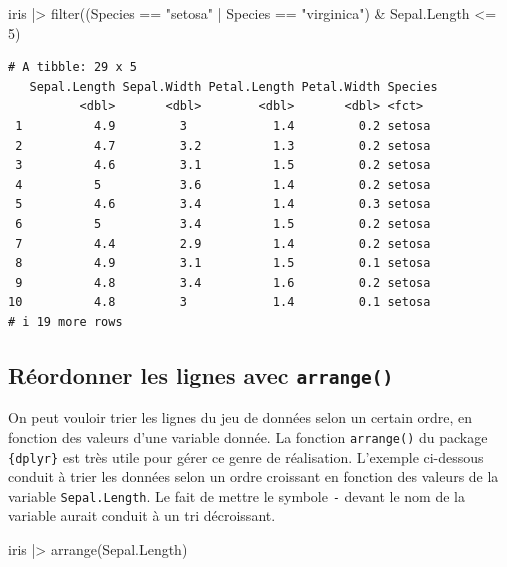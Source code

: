 \documentclass[
  letterpaper,
]{book}
\newenvironment{Shaded}{\begin{snugshade}}{\end{snugshade}}
\newcommand{\DecValTok}[1]{\textcolor[rgb]{0.68,0.00,0.00}{#1}}
\newcommand{\FunctionTok}[1]{\textcolor[rgb]{0.28,0.35,0.67}{#1}}
\newcommand{\NormalTok}[1]{\textcolor[rgb]{0.00,0.23,0.31}{#1}}
\newcommand{\SpecialCharTok}[1]{\textcolor[rgb]{0.37,0.37,0.37}{#1}}
\newcommand{\StringTok}[1]{\textcolor[rgb]{0.13,0.47,0.30}{#1}}
\begin{document}
\begin{Shaded}
\begin{Highlighting}[]
\NormalTok{iris }\SpecialCharTok{|\textgreater{}}
  \FunctionTok{filter}\NormalTok{((Species }\SpecialCharTok{==} \StringTok{"setosa"} \SpecialCharTok{|}\NormalTok{ Species }\SpecialCharTok{==} \StringTok{"virginica"}\NormalTok{) }\SpecialCharTok{\&}
\NormalTok{           Sepal.Length }\SpecialCharTok{\textless{}=} \DecValTok{5}\NormalTok{)}
\end{Highlighting}
\end{Shaded}

\begin{verbatim}
# A tibble: 29 x 5
   Sepal.Length Sepal.Width Petal.Length Petal.Width Species
          <dbl>       <dbl>        <dbl>       <dbl> <fct>  
 1          4.9         3            1.4         0.2 setosa 
 2          4.7         3.2          1.3         0.2 setosa 
 3          4.6         3.1          1.5         0.2 setosa 
 4          5           3.6          1.4         0.2 setosa 
 5          4.6         3.4          1.4         0.3 setosa 
 6          5           3.4          1.5         0.2 setosa 
 7          4.4         2.9          1.4         0.2 setosa 
 8          4.9         3.1          1.5         0.1 setosa 
 9          4.8         3.4          1.6         0.2 setosa 
10          4.8         3            1.4         0.1 setosa 
# i 19 more rows
\end{verbatim}

\subsection{\texorpdfstring{Réordonner les lignes avec
\texttt{arrange()}}{Réordonner les lignes avec arrange()}}\label{ruxe9ordonner-les-lignes-avec-arrange}

On peut vouloir trier les lignes du jeu de données selon un certain
ordre, en fonction des valeurs d'une variable donnée. La fonction
\texttt{arrange()} du package \texttt{\{dplyr\}} est très utile pour
gérer ce genre de réalisation. L'exemple ci-dessous conduit à trier les
données selon un ordre croissant en fonction des valeurs de la variable
\texttt{Sepal.Length}. Le fait de mettre le symbole \texttt{-} devant le
nom de la variable aurait conduit à un tri décroissant.

\begin{Shaded}
\begin{Highlighting}[]
\NormalTok{iris }\SpecialCharTok{|\textgreater{}}
  \FunctionTok{arrange}\NormalTok{(Sepal.Length)}
\end{Highlighting}
\end{Shaded}
\end{document}
